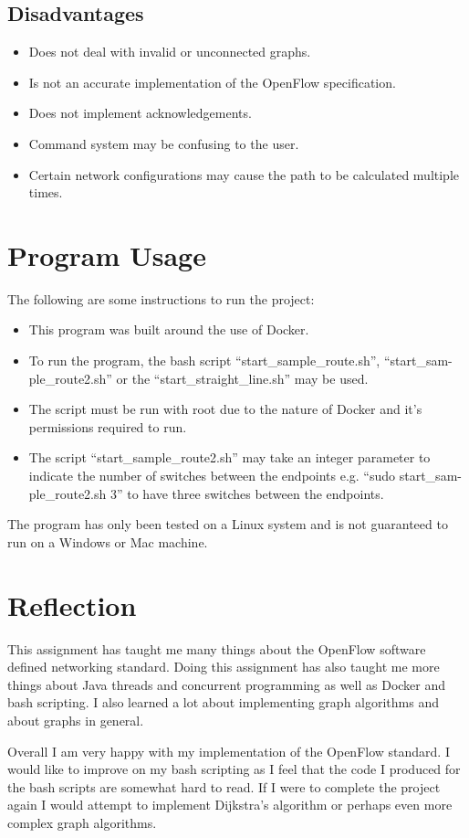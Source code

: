 \documentclass{article}
\begin{document}
\subsection{Disadvantages}
\begin{itemize}
  \item{Does not deal with invalid or unconnected graphs.}
  \item{Is not an accurate implementation of the OpenFlow specification.}
  \item{Does not implement acknowledgements.}
  \item{Command system may be confusing to the user.}
  \item{Certain network configurations may cause the path to be calculated
    multiple times.}
\end{itemize}

\section{Program Usage}
The following are some instructions to run the project:
\begin{itemize}
  \item{This program was built around the use of Docker.}
  \item{To run the program, the bash script ``start\_sample\_route.sh'',
    ``start\_sam-\\ple\_route2.sh'' or the ``start\_straight\_line.sh'' may be
  used.}
  \item{The script must be run with root due to the nature of Docker and it's
    permissions required to run.}
  \item{The script ``start\_sample\_route2.sh'' may take an integer parameter
    to indicate the number of switches between the endpoints e.g. ``sudo
  start\_sam-\\ple\_route2.sh 3'' to have three switches between the endpoints.}
\end{itemize}

The program has only been tested on a Linux system and is not guaranteed to run
on a Windows or Mac machine.

\section{Reflection}
This assignment has taught me many things about the OpenFlow software defined
networking standard. Doing this assignment has also taught me more things about
Java threads and concurrent programming as well as Docker and bash scripting. I
also learned a lot about implementing graph algorithms and about graphs in
general.

Overall I am very happy with my implementation of the OpenFlow standard. I would
like to improve on my bash scripting as I feel that the code I produced for the
bash scripts are somewhat hard to read. If I were to complete the project again
I would attempt to implement Dijkstra's algorithm or perhaps even more complex
graph algorithms.
\end{document}
